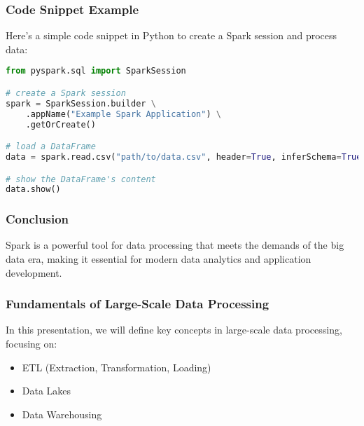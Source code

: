\documentclass[aspectratio=169]{beamer}
\begin{document}
\begin{frame}[fragile]
  \frametitle{Code Snippet Example}
  Here’s a simple code snippet in Python to create a Spark session and process data:
  \begin{lstlisting}[language=Python]
from pyspark.sql import SparkSession

# create a Spark session
spark = SparkSession.builder \
    .appName("Example Spark Application") \
    .getOrCreate()

# load a DataFrame
data = spark.read.csv("path/to/data.csv", header=True, inferSchema=True)

# show the DataFrame's content
data.show()
  \end{lstlisting}
\end{frame}

\begin{frame}[fragile]
  \frametitle{Conclusion}
  Spark is a powerful tool for data processing that meets the demands of the big data era, making it essential for modern data analytics and application development.
\end{frame}

\begin{frame}[fragile]
    \frametitle{Fundamentals of Large-Scale Data Processing}
    In this presentation, we will define key concepts in large-scale data processing, focusing on:
    \begin{itemize}
        \item ETL (Extraction, Transformation, Loading)
        \item Data Lakes
        \item Data Warehousing
    \end{itemize}
\end{frame}
\end{document}

